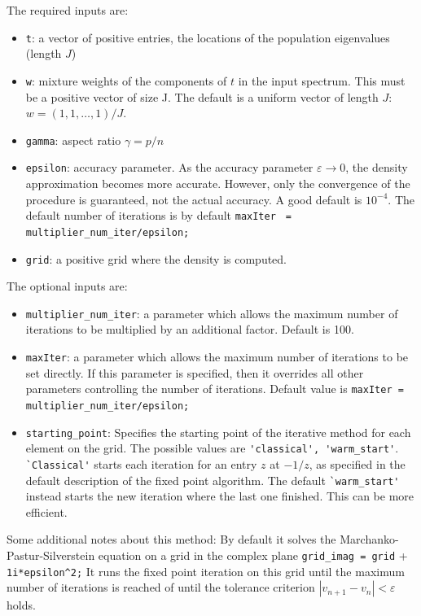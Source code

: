 \documentclass[english,11pt]{article} %
\begin{document}
 The required inputs are: 
\begin{itemize}
\item \verb+t+:  a vector of positive entries, the locations of the population eigenvalues (length $J$)
\item \verb+w+: mixture weights of the components of $t$ in the input spectrum. This must be a positive vector of size J. The default is a uniform vector of length $J$: $w = (1,1,\ldots,1)/J$.
\item \verb+gamma+:  aspect ratio $\gamma = p/n$
\item \verb+epsilon+: accuracy parameter. As the accuracy parameter $\varepsilon \to 0$, the density approximation becomes more accurate. However, only the convergence of the procedure is guaranteed, not the actual accuracy. A good default is $10^{-4}$. The default number of iterations is by default \verb+maxIter+ \verb+ = multiplier_num_iter/epsilon;+
\item \verb+grid+: a positive grid where the density is computed. 
\end{itemize}

 The optional inputs are: 
 
\begin{itemize}
\item \verb+multiplier_num_iter+: a parameter which allows the maximum number of iterations to be multiplied by an additional factor. Default is 100.
\item \verb+maxIter+: a parameter which allows the maximum number of iterations to be set directly. If this parameter is specified, then it overrides all other parameters controlling the number of iterations.  Default value is \verb+maxIter = multiplier_num_iter/epsilon;+
\item \verb+starting_point+: Specifies the starting point of the iterative method for each element on the grid. The possible values are \verb+'classical', 'warm_start'+. \verb+`Classical'+ starts each iteration for an entry $z$ at $-1/z$, as specified in the default description of the fixed point algorithm. The default \verb+`warm_start'+ instead starts the new iteration where the last one finished. This can be more efficient.
\end{itemize} 
 
Some additional notes about this method: By default it solves the Marchanko-Pastur-Silverstein equation on a grid in the complex plane \verb+grid_imag = grid+ + \verb+  1i*epsilon^2;+ It runs the fixed point iteration on this grid until the maximum number of iterations is reached of until the tolerance criterion $|v_{n+1}-v_n|<\varepsilon$ holds. 
\end{document}
